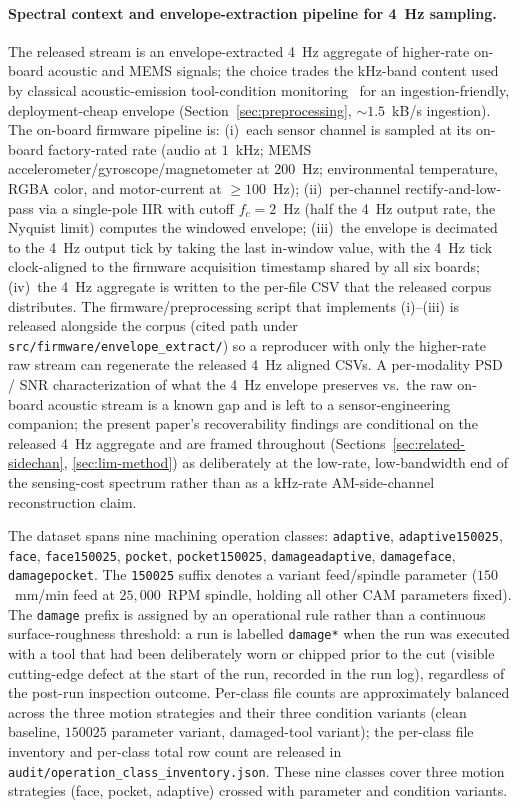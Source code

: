 \documentclass[sensors,article,submit,moreauthors,pdftex]{Definitions/mdpi}
\begin{document}
\paragraph{Spectral context and envelope-extraction pipeline for 4~Hz sampling.} The released stream is an envelope-extracted 4~Hz aggregate of higher-rate on-board acoustic and MEMS signals; the choice trades the kHz-band content used by classical acoustic-emission tool-condition monitoring~\cite{teti2010advanced} for an ingestion-friendly, deployment-cheap envelope (Section~\ref{sec:preprocessing}, $\sim 1.5$~kB/s ingestion). The on-board firmware pipeline is: (i)~each sensor channel is sampled at its on-board factory-rated rate (audio at $1$~kHz; MEMS accelerometer/gyroscope/magnetometer at $200$~Hz; environmental temperature, RGBA color, and motor-current at $\geq\!100$~Hz); (ii)~per-channel rectify-and-low-pass via a single-pole IIR with cutoff $f_c\!=\!2$~Hz (half the 4~Hz output rate, the Nyquist limit) computes the windowed envelope; (iii)~the envelope is decimated to the 4~Hz output tick by taking the last in-window value, with the 4~Hz tick clock-aligned to the firmware acquisition timestamp shared by all six boards; (iv)~the 4~Hz aggregate is written to the per-file CSV that the released corpus distributes. The firmware/preprocessing script that implements (i)--(iii) is released alongside the corpus (cited path under \texttt{src/firmware/envelope\_extract/}) so a reproducer with only the higher-rate raw stream can regenerate the released 4~Hz aligned CSVs. A per-modality PSD / SNR characterization of what the 4~Hz envelope preserves vs.\ the raw on-board acoustic stream is a known gap and is left to a sensor-engineering companion; the present paper's recoverability findings are conditional on the released 4~Hz aggregate and are framed throughout (Sections~\ref{sec:related-sidechan}, \ref{sec:lim-method}) as deliberately at the low-rate, low-bandwidth end of the sensing-cost spectrum rather than as a kHz-rate AM-side-channel reconstruction claim.

The dataset spans nine machining operation classes: \texttt{adaptive}, \texttt{adaptive150025}, \texttt{face}, \texttt{face150025}, \texttt{pocket}, \texttt{pocket150025}, \texttt{damageadaptive}, \texttt{damageface}, \texttt{damagepocket}. The \texttt{150025} suffix denotes a variant feed/spindle parameter ($150$~mm/min feed at $25{,}000$~RPM spindle, holding all other CAM parameters fixed). The \texttt{damage} prefix is assigned by an operational rule rather than a continuous surface-roughness threshold: a run is labelled \texttt{damage*} when the run was executed with a tool that had been deliberately worn or chipped prior to the cut (visible cutting-edge defect at the start of the run, recorded in the run log), regardless of the post-run inspection outcome. Per-class file counts are approximately balanced across the three motion strategies and their three condition variants (clean baseline, $150025$ parameter variant, damaged-tool variant); the per-class file inventory and per-class total row count are released in \texttt{audit/operation\_class\_inventory.json}. These nine classes cover three motion strategies (face, pocket, adaptive) crossed with parameter and condition variants.
\end{document}
